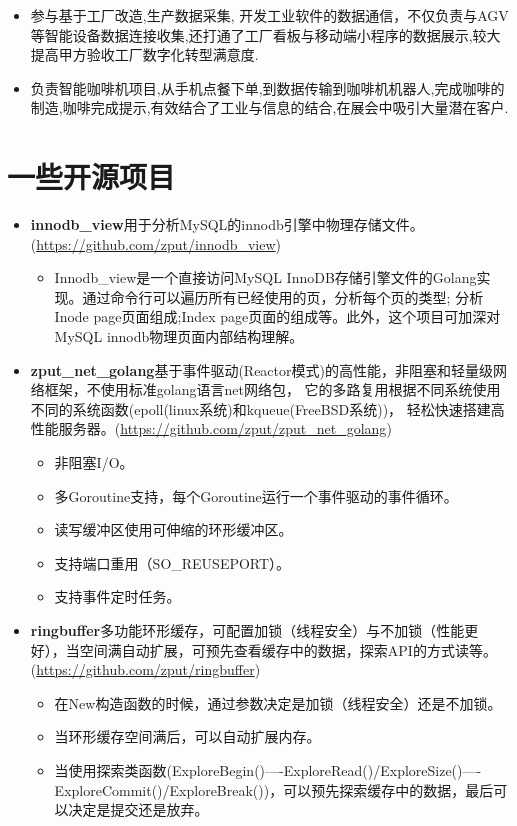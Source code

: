 \documentclass{resume}
\begin{document}
\begin{itemize}[parsep=0.2ex]
  \item 参与基于工厂改造,生产数据采集, 开发工业软件的数据通信，不仅负责与AGV等智能设备数据连接收集,还打通了工厂看板与移动端小程序的数据展示,较大提高甲方验收工厂数字化转型满意度.
  \item 负责智能咖啡机项目,从手机点餐下单,到数据传输到咖啡机机器人,完成咖啡的制造,咖啡完成提示,有效结合了工业与信息的结合,在展会中吸引大量潜在客户.
\end{itemize}

\section{一些开源项目}
\begin{itemize}[parsep=0.2ex]
  \item \textbf{innodb\_view}用于分析MySQL的innodb引擎中物理存储文件。(\url{https://github.com/zput/innodb_view})
    \begin{itemize}[parsep=0.2ex]
        \item Innodb\_view是一个直接访问MySQL InnoDB存储引擎文件的Golang实现。通过命令行可以遍历所有已经使用的页，分析每个页的类型; 分析Inode page页面组成;Index page页面的组成等。此外，这个项目可加深对MySQL innodb物理页面内部结构理解。
    \end{itemize}

  \item \textbf{zput\_net\_golang}基于事件驱动(Reactor模式)的高性能，非阻塞和轻量级网络框架，不使用标准golang语言net网络包， 它的多路复用根据不同系统使用不同的系统函数(epoll(linux系统)和kqueue(FreeBSD系统))， 轻松快速搭建高性能服务器。(\url{https://github.com/zput/zput_net_golang})
    \begin{itemize}[parsep=0.2ex]
          \item 非阻塞I/O。
          \item 多Goroutine支持，每个Goroutine运行一个事件驱动的事件循环。
          \item 读写缓冲区使用可伸缩的环形缓冲区。
          \item 支持端口重用（SO\_REUSEPORT）。
          \item 支持事件定时任务。
    \end{itemize}

  \item \textbf{ringbuffer}多功能环形缓存，可配置加锁（线程安全）与不加锁（性能更好），当空间满自动扩展，可预先查看缓存中的数据，探索API的方式读等。(\url{https://github.com/zput/ringbuffer})
    \begin{itemize}[parsep=0.2ex]
          \item 在New构造函数的时候，通过参数决定是加锁（线程安全）还是不加锁。
          \item 当环形缓存空间满后，可以自动扩展内存。
          \item 当使用探索类函数(ExploreBegin()----ExploreRead()/ExploreSize()----ExploreCommit()/ExploreBreak())，可以预先探索缓存中的数据，最后可以决定是提交还是放弃。
    \end{itemize}


\end{itemize}
\end{document}
